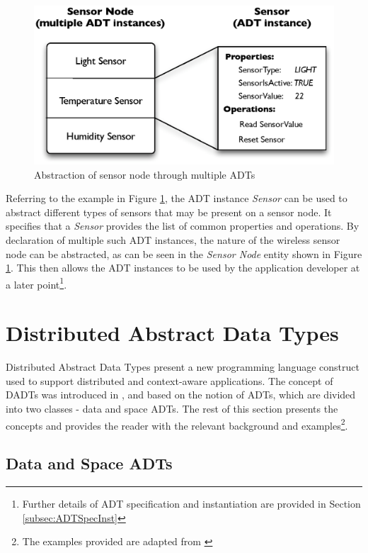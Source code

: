 \begin{figure}[h]
\centering
\includegraphics[scale=0.71]{img/ADTsMultipleInstances.eps}
\caption[Abstraction of sensor node through multiple ADTs]{Abstraction of sensor node through multiple ADTs}
\label{Fig:MultipleADTs}
\end{figure} 
  
Referring to the example in Figure \ref{Fig:MultipleADTs}, the ADT instance
\emph{Sensor} can be used to abstract different types of sensors that may be
present on a sensor node. It specifies that a \emph{Sensor} provides the list of
common properties and operations. By declaration of multiple such ADT instances,
the nature of the wireless sensor node can be abstracted, as can be seen in the
\emph{Sensor Node} entity shown in Figure \ref{Fig:MultipleADTs}. This then
allows the ADT instances to be used by the application developer at a later
point\footnote{Further details of ADT specification and instantiation are
provided in Section \ref{subsec:ADTSpecInst}}.

\section {Distributed Abstract Data Types} \label{sec:DADT}

Distributed Abstract Data Types present a new programming language construct
used to support distributed and context-aware applications. The concept of DADTs was
introduced in \cite{migliavacca_DADT:2006}, and based on the notion of ADTs,
which are divided into two classes - data and space ADTs. 
The rest of this section presents the concepts and provides the reader with the
relevant background and examples\footnote{The examples provided are adapted from \cite{migliavacca_DADT:2006}}.

\subsection{Data and Space ADTs} \label{subsubsec:DataAndSpaceADTs}

